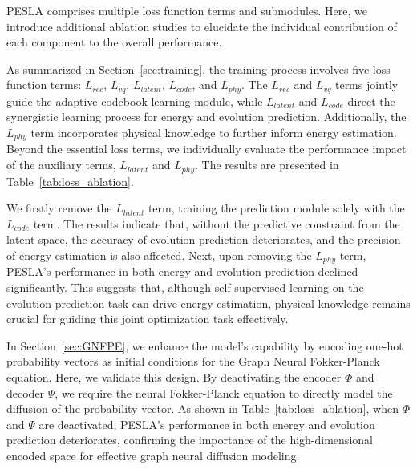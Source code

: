 PESLA comprises multiple loss function terms and submodules. Here, we introduce additional ablation studies to elucidate the individual contribution of each component to the overall performance.

As summarized in Section~\ref{sec:training}, the training process involves five loss function terms: $L_{rec}$, $L_{vq}$, $L_{latent}$, $L_{code}$, and $L_{phy}$. The $L_{rec}$ and $L_{vq}$ terms jointly guide the adaptive codebook learning module, while $L_{latent}$ and $L_{code}$ direct the synergistic learning process for energy and evolution prediction. Additionally, the $L_{phy}$ term incorporates physical knowledge to further inform energy estimation. Beyond the essential loss terms, we individually evaluate the performance impact of the auxiliary terms, $L_{latent}$ and $L_{phy}$. The results are presented in Table~\ref{tab:loss_ablation}.

We firstly remove the $L_{latent}$ term, training the prediction module solely with the $L_{code}$ term. The results indicate that, without the predictive constraint from the latent space, the accuracy of evolution prediction deteriorates, and the precision of energy estimation is also affected. Next, upon removing the $L_{phy}$ term, PESLA’s performance in both energy and evolution prediction declined significantly. This suggests that, although self-supervised learning on the evolution prediction task can drive energy estimation, physical knowledge remains crucial for guiding this joint optimization task effectively.

In Section~\ref{sec:GNFPE}, we enhance the model’s capability by encoding one-hot probability vectors as initial conditions for the Graph Neural Fokker-Planck equation. Here, we validate this design. By deactivating the encoder $\Phi$ and decoder $\Psi$, we require the neural Fokker-Planck equation to directly model the diffusion of the probability vector. As shown in Table~\ref{tab:loss_ablation}, when $\Phi$ and $\Psi$ are deactivated, PESLA’s performance in both energy and evolution prediction deteriorates, confirming the importance of the high-dimensional encoded space for effective graph neural diffusion modeling.

